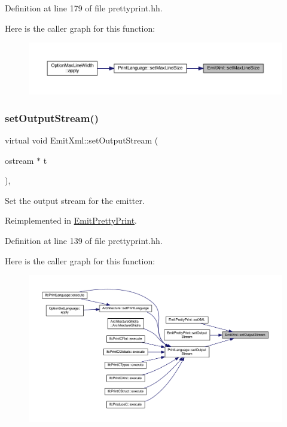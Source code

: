Definition at line 179 of file prettyprint.\+hh.

Here is the caller graph for this function\+:
\nopagebreak
\begin{figure}[H]
\begin{center}
\leavevmode
\includegraphics[width=350pt]{class_emit_xml_a037f97e86e503c8f2cf61faf5f510ec2_icgraph}
\end{center}
\end{figure}
\mbox{\label{class_emit_xml_a92a27602a190342a8f055fdcc178f5b9}} 
\subsubsection{\texorpdfstring{setOutputStream()}{setOutputStream()}}
{\footnotesize\ttfamily virtual void Emit\+Xml\+::set\+Output\+Stream (\begin{DoxyParamCaption}\item[{ostream $\ast$}]{t }\end{DoxyParamCaption})\hspace{0.3cm}{\ttfamily [inline]}, {\ttfamily [virtual]}}



Set the output stream for the emitter. 



Reimplemented in \mbox{\hyperlink{class_emit_pretty_print_a049d0fd7579b85ec08321f08db93caad}{Emit\+Pretty\+Print}}.



Definition at line 139 of file prettyprint.\+hh.

Here is the caller graph for this function\+:
\nopagebreak
\begin{figure}[H]
\begin{center}
\leavevmode
\includegraphics[width=350pt]{class_emit_xml_a92a27602a190342a8f055fdcc178f5b9_icgraph}
\end{center}
\end{figure}
\mbox{\label{class_emit_xml_ab2e3fc4934aade587c0b5a8706c9dfa0}} 
